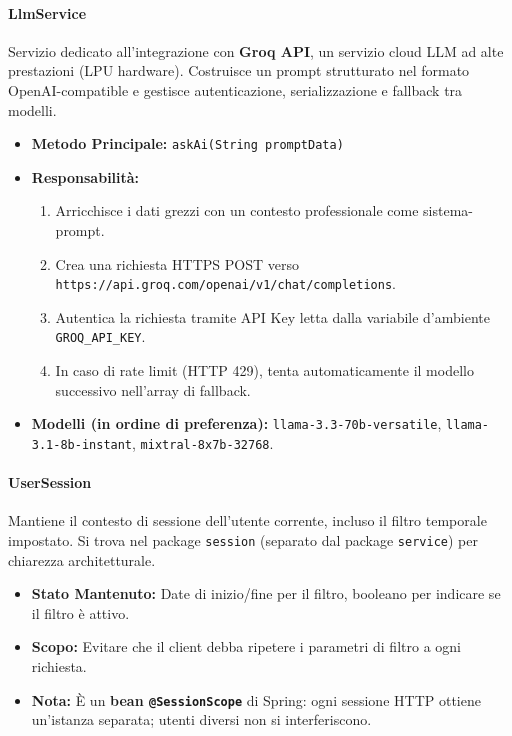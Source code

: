 \documentclass[a4paper,12pt]{report}
\begin{document}
\paragraph{LlmService}
Servizio dedicato all'integrazione con \textbf{Groq API}, un servizio cloud LLM ad alte prestazioni (LPU hardware). Costruisce un prompt strutturato nel formato OpenAI-compatible e gestisce autenticazione, serializzazione e fallback tra modelli.
\begin{itemize}
    \item \textbf{Metodo Principale:} \texttt{askAi(String promptData)}
    \item \textbf{Responsabilità:}
    \begin{enumerate}
        \item Arricchisce i dati grezzi con un contesto professionale come sistema-prompt.
        \item Crea una richiesta HTTPS POST verso \texttt{https://api.groq.com/openai/v1/chat/completions}.
        \item Autentica la richiesta tramite API Key letta dalla variabile d'ambiente \texttt{GROQ\_API\_KEY}.
        \item In caso di rate limit (HTTP 429), tenta automaticamente il modello successivo nell'array di fallback.
    \end{enumerate}
    \item \textbf{Modelli (in ordine di preferenza):} \texttt{llama-3.3-70b-versatile}, \texttt{llama-3.1-8b-instant}, \texttt{mixtral-8x7b-32768}.
\end{itemize}

\paragraph{UserSession}
Mantiene il contesto di sessione dell'utente corrente, incluso il filtro temporale impostato. Si trova nel package \texttt{session} (separato dal package \texttt{service}) per chiarezza architetturale.
\begin{itemize}
    \item \textbf{Stato Mantenuto:} Date di inizio/fine per il filtro, booleano per indicare se il filtro è attivo.
    \item \textbf{Scopo:} Evitare che il client debba ripetere i parametri di filtro a ogni richiesta.
    \item \textbf{Nota:} È un \textbf{bean \texttt{@SessionScope}} di Spring: ogni sessione HTTP ottiene un'istanza separata; utenti diversi non si interferiscono.
\end{itemize}
\end{document}
